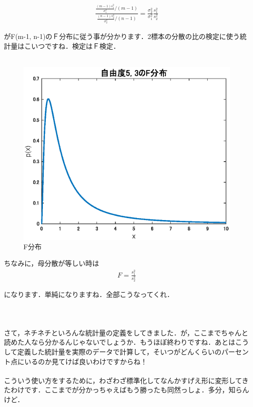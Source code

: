 \documentclass[11pt,a4paper]{ujreport} 	%
\begin{document}
\begin{align}
  \frac{\frac{(m-1)s_1^2}{\sigma_1^2} / (m-1)}{\frac{(n-1)s_2^2}{\sigma_2^2} / (n-1)} = \frac{\sigma_2^2}{\sigma_1^2}\frac{s_1^2}{s_2^2}
  \label{eq:fisher}
\end{align}

がF(m-1, n-1)のＦ分布に従う事が分かります．2標本の分散の比の検定に使う統計量はこいつですね．検定はＦ検定．\\
\\

\begin{figure}[H]
  \centering
  \includegraphics[width=12cm]{../figures/f_dist.eps}
  \caption{F分布}
\end{figure}

ちなみに，母分散が等しい時は
\begin{align}
  F= \frac{s_1^2}{s_2^2}
\end{align}

になります．単純になりますね．全部こうなってくれ．\\
\\
\\
\\

さて，ネチネチといろんな統計量の定義をしてきました．が，ここまでちゃんと読めた人なら分かるんじゃないでしょうか．もうほぼ終わりですね．あとはこうして定義した統計量を実際のデータで計算して，そいつがどんくらいのパーセント点にいるのか見てけば良いわけですからね！\\
\\

こういう使い方をするために，わざわざ標準化してなんかすげえ形に変形してきたわけです．ここまでが分かっちゃえばもう勝ったも同然っしょ．多分，知らんけど．
\end{document}
